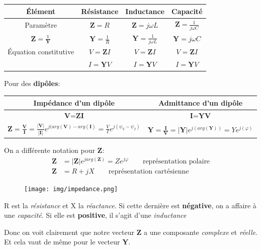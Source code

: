 \documentclass{report}
\begin{document}
\begin{center}
\begin{tabular}{|c|c|c|c|}
\hline
Élément & Résistance & Inductance & Capacité\\
\hline 
Paramètre & $\textbf{Z} = R$ & $\textbf{Z} = j\omega L$ & $\textbf{Z} = \frac{1}{j \omega C}$\\
$\textbf{Z} = \frac{1}{\textbf{Y}}$ & $\textbf{Y} = \frac{1}{R}$ & $\textbf{Y} = \frac{1}{j \omega L}$ & $\textbf{Y} = j \omega C$ \\
\hline 
Équation constitutive & $V = \textbf{Z}I$ & $V = \textbf{Z}I$ & $V = \textbf{Z}I$\\
 & $I = \textbf{Y}V$ & $I = \textbf{Y}V$ & $I = \textbf{Y}V$\\
\hline
\end{tabular}
\end{center}

Pour des \textbf{dipôles}:
\begin{center}
\begin{tabular}{|c|c|}
\hline
\textbf{Impédance} d'un dipôle & \textbf{Admittance} d'un dipôle\\
\hline
$\textbf{V} = \textbf{ZI}$ & $\textbf{I} = \textbf{YV}$\\
\hline
$\textbf{Z} = \frac{\textbf{V}}{\textbf{I}} = \frac{|\textbf{V}|}{|\textbf{I}|}e^{j(arg(\textbf{V})-arg(\textbf{I})} = \frac{V}{I} e^{j{(\psi_V-\psi_I)}}$ & $\textbf{Y} = \frac{\textbf{I}}{\textbf{V}} = |\textbf{Y}|e^{j(arg(\textbf{Y}))} = Y e^{j{(\varphi)}}$\\
\hline
\end{tabular}
\end{center}

On a différente notation pour $\textbf{Z}$:
\begin{align}
\textbf{Z} &= |\textbf{Z}|e^{j arg(\textbf{Z})} = Z e^{j\varphi} \qquad \text{représentation polaire}\\
\textbf{Z} &= R +jX \qquad \text{représentation cartésienne}
\end{align}
\begin{figure}
\centering
\texttt{[image: img/impedance.png]}
\end{figure}

R est la \textit{résistance} et X la \textit{réactance}. Si cette dernière est \textbf{négative}, on a affaire à une \textit{capacité}. Si elle est \textbf{positive}, il s'agit d'une \textit{inductance}

Donc on voit clairement que notre vecteur \textbf{Z} a une composante \textit{complexe} et \textit{réelle}. Et cela vaut de même pour le vecteur \textbf{Y}.
\end{document}
